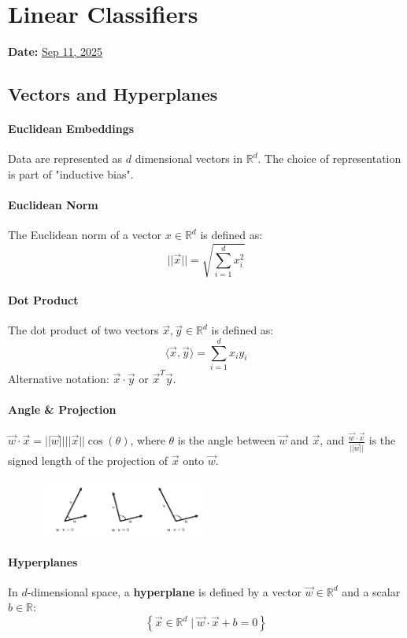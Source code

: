 \section{Linear Classifiers}
\textbf{Date:} \underline{Sep 11, 2025}

\subsection{Vectors and Hyperplanes}
\paragraph{Euclidean Embeddings}
Data are represented as $d$ dimensional vectors in $\mathbb{R}^d$. The choice of representation is part of "inductive bias".

\paragraph{Euclidean Norm}
The Euclidean norm of a vector $x \in \mathbb{R}^d$ is defined as:
\[||\vec{x}|| = \sqrt{\sum_{i=1}^{d} x_i^2}\]

\paragraph{Dot Product}
The dot product of two vectors $\vec{x}, \vec{y} \in \mathbb{R}^d$ is defined as:
\[
\langle \vec{x}, \vec{y} \rangle = \sum_{i=1}^{d} x_i y_i
\]
Alternative notation: $\vec{x} \cdot \vec{y}$ or $\vec{x}^T \vec{y}$.

\paragraph{Angle \& Projection}
$\vec{w} \cdot \vec{x} = ||\vec{w}|| ||\vec{x}|| \cos(\theta)$, where $\theta$ is the angle between $\vec{w}$ and $\vec{x}$, and $\frac{\vec{w} \cdot \vec{x}}{||\vec{w}||}$ is the signed length of the projection of $\vec{x}$ onto $\vec{w}$.

\begin{figure}[h]
    \centering
    \includegraphics[width=0.5\textwidth]{Images/dot_product.png}
\end{figure}

\paragraph{Hyperplanes}
In $d$-dimensional space, a \textbf{hyperplane} is defined by a vector $\vec{w} \in \mathbb{R}^d$ and a scalar $b \in \mathbb{R}$:
\[
\left\{ \vec{x} \in \mathbb{R}^d \mid \vec{w} \cdot \vec{x} + b = 0 \right\}
\]

